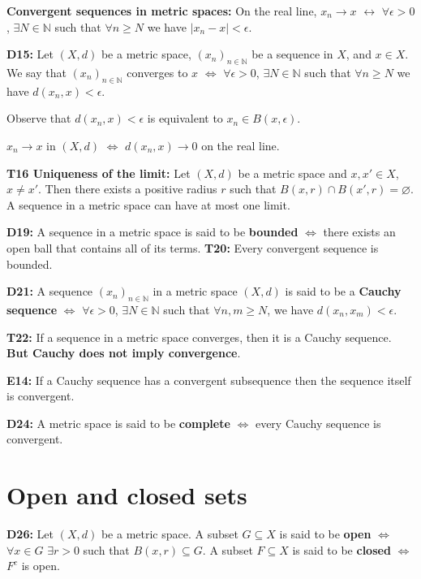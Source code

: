 \documentclass[twocolumn,10pt]{article}
\begin{document}
\textbf{Convergent sequences in metric spaces:} On the real line, $x_n\to x$ $\leftrightarrow$ $\forall\epsilon>0$, $\exists N\in\mathbb{N}$ such that $\forall n\geq N$ we have $|x_n-x|<\epsilon$.

\textbf{D15:} Let $(X,d)$ be a metric space, $(x_n)_{n\in\mathbb{N}}$ be a sequence in $X$, and $x\in X$. We say that $(x_n)_{n\in\mathbb{N}}$ converges to $x$ $\Leftrightarrow$ $\forall\epsilon>0$, $\exists N\in\mathbb{N}$ such that $\forall n\geq N$ we have $d(x_n,x)<\epsilon$.

Observe that $d(x_n,x)<\epsilon$ is equivalent to $x_n\in B(x,\epsilon)$.

$x_n\to x$ in $(X,d)$ $\Leftrightarrow$ $d(x_n,x)\to0$ on the real line.

\textbf{T16 Uniqueness of the limit:} Let $(X,d)$ be a metric space and $x,x'\in X$, $x\neq x'$. Then there exists a positive radius $r$ such that $B(x,r)\cap B(x',r)=\varnothing$. A sequence in a metric space can have at most one limit.

\textbf{D19:} A sequence in a metric space is said to be \textbf{bounded} $\Leftrightarrow$ there exists an open ball that contains all of its terms. \textbf{T20:} Every convergent sequence is bounded.

\textbf{D21:} A sequence $(x_n)_{n\in\mathbb{N}}$ in a metric space $(X,d)$ is said to be a \textbf{Cauchy sequence} $\Leftrightarrow$ $\forall\epsilon>0$, $\exists N\in\mathbb{N}$ such that $\forall n,m\geq N$, we have $d(x_n,x_m)<\epsilon$.

\textbf{T22:} If a sequence in a metric space converges, then it is a Cauchy sequence. \textbf{But Cauchy does not imply convergence}.

\textbf{E14:} If a Cauchy sequence has a convergent subsequence then the sequence itself is convergent.

\textbf{D24:} A metric space is said to be \textbf{complete} $\Leftrightarrow$ every Cauchy sequence is convergent.


\section{Open and closed sets}

\textbf{D26:} Let $(X,d)$ be a metric space. A subset $G\subseteq X$ is said to be \textbf{open} $\Leftrightarrow$ $\forall x\in G$ $\exists r>0$ such that $B(x,r)\subseteq G$. A subset $F\subseteq X$ is said to be \textbf{closed} $\Leftrightarrow$ $F^c$ is open.
\end{document}
